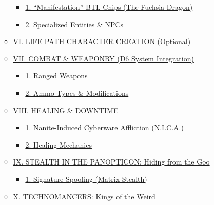 \documentclass[
  oneside]{article}
\providecommand{\tightlist}{%
  \setlength{\itemsep}{0pt}\setlength{\parskip}{0pt}}
\begin{document}
\begin{multicols}{2}
\begin{itemize}
\begin{itemize}
    \begin{itemize}
    \tightlist
    \item
      \protect\hyperlink{1-manifestation-btl-chips-the-fuchsia-dragon}{1.
      ``Manifestation'' BTL Chips (The Fuchsia
      Dragon)}
    \item
      \protect\hyperlink{2-specialized-entities--npcs}{2.
      Specialized Entities \& NPCs}
    \end{itemize}
  \item
    \protect\hyperlink{vi-life-path-character-creation-optional}{VI.
    LIFE PATH CHARACTER CREATION (Optional)}
  \item
    \protect\hyperlink{vii-combat--weaponry-d6-system-integration}{VII.
    COMBAT \& WEAPONRY (D6 System Integration)}

    \begin{itemize}
    \tightlist
    \item
      \protect\hyperlink{1-ranged-weapons}{1.
      Ranged Weapons}
    \item
      \protect\hyperlink{2-ammo-types--modifications}{2.
      Ammo Types \& Modifications}
    \end{itemize}
  \item
    \protect\hyperlink{viii-healing--downtime}{VIII.
    HEALING \& DOWNTIME}

    \begin{itemize}
    \tightlist
    \item
      \protect\hyperlink{1-nanite-induced-cyberware-affliction-nica}{1.
      Nanite-Induced Cyberware Affliction
      (N.I.C.A.)}
    \item
      \protect\hyperlink{2-healing-mechanics}{2.
      Healing Mechanics}
    \end{itemize}
  \item
    \protect\hyperlink{ix-stealth-in-the-panopticon-hiding-from-the-goo}{IX.
    STEALTH IN THE PANOPTICON: Hiding from the
    Goo}

    \begin{itemize}
    \tightlist
    \item
      \protect\hyperlink{1-signature-spoofing-matrix-stealth}{1.
      Signature Spoofing (Matrix Stealth)}
    \end{itemize}
  \item
    \protect\hyperlink{x-technomancers-kings-of-the-weird}{X.
    TECHNOMANCERS: Kings of the Weird}


\end{itemize}
\end{itemize}
\end{multicols}
\end{document}
